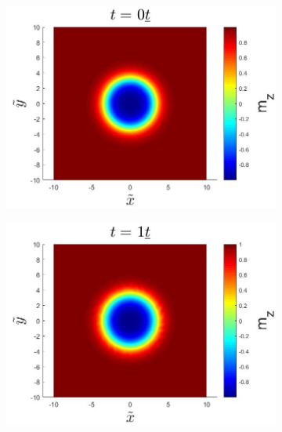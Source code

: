 \begin{figure}[h!]
\begin{subfigure}{.3\textwidth}
  \centering
  \includegraphics[width=\linewidth]{Figures/StaticSkyrmionMzT0.jpg}
  \caption{}
  \label{fig:StaticSkyrmionMzT0}
\end{subfigure}
\begin{subfigure}{.3\textwidth}
  \centering
  \includegraphics[width=\linewidth]{Figures/StaticSkyrmionMzT1.jpg}
  \caption{}
  \label{fig:StaticSkyrmionMzT1}
\end{subfigure}
\begin{subfigure}{.3\textwidth}
  \centering

\end{subfigure}
\end{figure}
